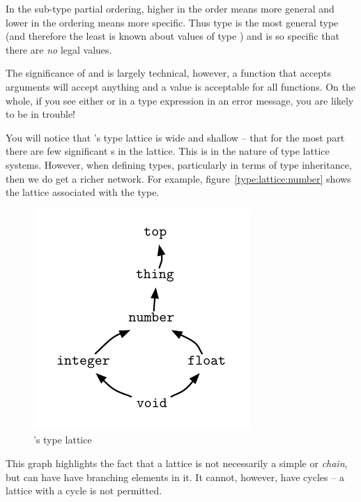 In the sub-type partial ordering, higher in the order means more general and lower in the ordering means more specific. Thus  type is the most general type (and therefore the least is known about values of type ) and  is so specific that there are \emph{no} legal  values.

The significance of  and  is largely technical, however, a function that accepts  arguments will accept anything and a  value is acceptable for all functions. On the whole, if you see either  or  in a type expression in an error message, you are likely to be in trouble!

You will notice that \go's type lattice is wide and shallow -- that for the most part there are few significant s in the lattice. This is in the nature of type lattice systems. However, when defining types, particularly in terms of type inheritance, then we do get a richer network. For example, figure~\vref{type:lattice:number} shows the lattice associated with the  type.

\begin{figure}
\centerline{\includegraphics{numberlattice}}
\caption{\label{type:lattice:number}\go's  type lattice}
\end{figure}

This graph highlights the fact that a lattice is not necessarily a simple  or \emph{chain}, but can have have branching elements in it. It cannot, however, have cycles -- a lattice with a cycle is not permitted.

